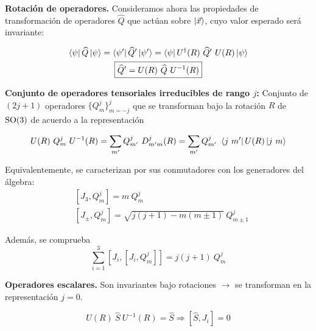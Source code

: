 \begin{flushleft}
\textbf{Rotación de operadores.} Consideramos ahora las propiedades de transformación de operadores $\widehat{Q}$ que actúan sobre $\left|\vec{x}\right\rangle$, cuyo valor esperado será invariante:
\end{flushleft}
\begin{gather}
\braopket{\psi}{\widehat{Q}}{\psi}=\braopket{\psi'}{\widehat{Q}'}{\psi'}=\braopket{\psi}{U^{\dagger}(R)\ \widehat{Q}'\ U(R)}{\psi}\\
\boxed{\widehat{Q}'=U(R)\ \widehat{Q}\ U^{-1}(R)}
\end{gather}


\begin{flushleft}
\textbf{Conjunto de operadores tensoriales irreducibles de rango $j$:} Conjunto de $(2j+1)$ operadores $\{Q_m^j\}_{m=-j}^j$ que se transforman bajo la rotación $R$ de $\mathrm{SO}(3)$ de acuerdo a la representación
\end{flushleft}
\begin{equation}
U(R)\ Q_m^j\ U^{-1}(R)=\sum_{m'}Q_{m'}^j\ D_{m'm}^j(R)=\sum_{m'}Q_{m'}^j\ \braopket{j\ m'}{U(R)}{j\ m}
\end{equation}

Equivalentemente, se caracterizan por sus conmutadores con los generadores del álgebra:
\begin{subequations}
\begin{flalign}
& [J_3,Q_m^j]=m\ Q_m^j\\
& [J_\pm,Q_m^j]=\sqrt{j(j+1)-m(m\pm1)}\ Q_{m\pm1}^j
\end{flalign}
\end{subequations}

Además, se comprueba
\begin{equation}
\sum_{i=1}^3 [J_i,[J_i,Q_m^j]]=j(j+1)\ Q_m^j
\end{equation}

\begin{flushleft}
\textbf{Operadores escalares.} Son invariantes bajo rotaciones $\longrightarrow$ se transforman en la representación $j=0$.
\end{flushleft}
\begin{equation}
U(R)\ \widehat{S}\ U^{-1}(R)=\widehat{S}\Longrightarrow[\widehat{S},J_i]=0
\end{equation}

